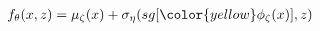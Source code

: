 \documentclass[preview]{standalone}
\begin{document}
\begin{align*}
f_\theta (x,z) =  \mu_{\zeta}(x) + \sigma_{\eta}(sg[\color{yellow}\phi_\zeta (x)],z)
\end{align*}
\end{document}
